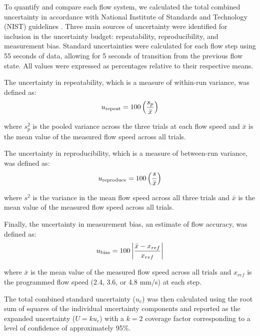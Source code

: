 \documentclass[12pt]{spieman}
\begin{document}
\begin{spacing}{2}
To quantify and compare each flow system, we calculated the total combined uncertainty in accordance with National Institute of Standards and Technology (NIST) guidelines \cite{Taylor.199438,NIST:2002}. Three main sources of uncertainty were identified for inclusion in the uncertainty budget: repeatability, reproducibility, and measurement bias. Standard uncertainties were calculated for each flow step using 55 seconds of data, allowing for 5 seconds of transition from the previous flow state. All values were expressed as percentages relative to their respective means.

The uncertainty in repeatability, which is a measure of within-run variance, was defined as:
%
\begin{equation}
    \label{eq:u_repeat}
    u_\textnormal{repeat} = 100\left(\frac{s_p}{\bar{x}}\right)
\end{equation}

\noindent where $s_p^2$ is the pooled variance across the three trials at each flow speed and $\bar{x}$ is the mean value of the measured flow speed across all trials.

The uncertainty in reproducibility, which is a measure of between-run variance, was defined as:
%
\begin{equation}
    \label{eq:u_reproduce}
    u_\textnormal{reproduce} = 100\left(\frac{s}{\bar{x}}\right)
\end{equation}

\noindent where $s^2$ is the variance in the mean flow speed across all three trials and $\bar{x}$ is the mean value of the measured flow speed across all trials.

Finally, the uncertainty in measurement bias, an estimate of flow accuracy, was defined as:
%
\begin{equation}
    \label{eq:u_bias}
    u_\textnormal{bias} = 100 \left| \frac{\bar{x} - x_{ref}}{x_{ref}} \right|
\end{equation}

\noindent where $\bar{x}$ is the mean value of the measured flow speed across all trials and $x_{ref}$ is the programmed flow speed (2.4, 3.6, or 4.8 mm/s) at each step.

The total combined standard uncertainty ($u_c$) was then calculated using the root sum of squares of the individual uncertainty components and reported as the expanded uncertainty ($U=ku_c$) with a $k=2$ coverage factor corresponding to a level of confidence of approximately 95\%.



\end{spacing}
\end{document}
